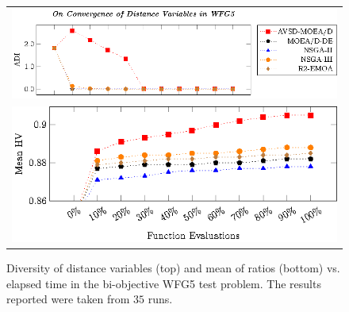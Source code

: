 \begin{figure}[t]
\centering
\begin{tabular}{l}
 \includegraphics[scale=0.75]{images/Diversity_Long_Term_tikz_WFG5-figure0.eps}\\[0cm]%
 \includegraphics[scale=0.75]{images/Diversity_Long_Term_tikz_WFG5-figure1.eps}\\[0cm]%
\end{tabular}
\caption{Diversity of distance variables (top) and mean of \HV{} ratios (bottom) vs. elapsed time in the bi-objective WFG5 test problem. The results reported were taken from $35$ runs.}\label{fig:WFG5_Diversity}
\end{figure}


